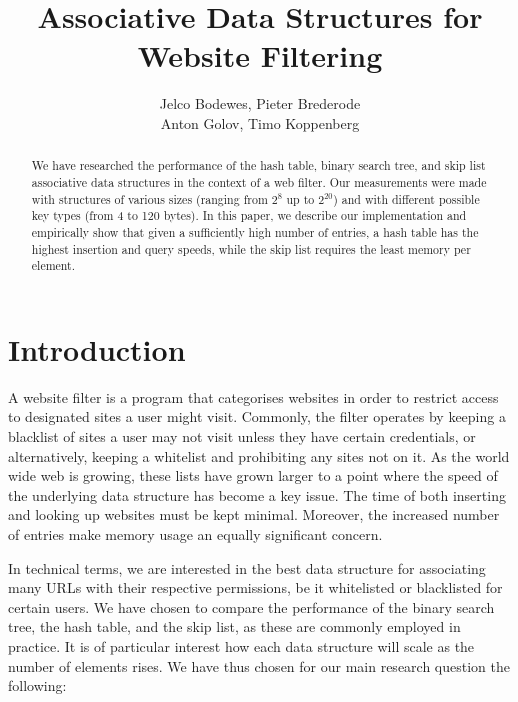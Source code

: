\documentclass[12pt,a4paper]{article}
\title{Associative Data Structures for Website Filtering}
\author{Jelco Bodewes, Pieter Brederode \\ Anton Golov, Timo Koppenberg }
\begin{document}
    \maketitle

    \begin{abstract}
        We have researched the performance of the hash table, binary search tree, and skip list
        associative data structures in the context of a web filter.  Our measurements were made with
        structures of various sizes (ranging from $2^8$ up to $2^{20}$) and with different possible
        key types (from 4 to 120 bytes).  In this paper, we describe our implementation and
        empirically show that given a sufficiently high number of entries, a hash table has the
        highest insertion and query speeds, while the skip list requires the least memory per
        element.
    \end{abstract}


    \section{Introduction}
    A website filter is a program that categorises websites in order to restrict access to
    designated sites a user might visit. Commonly, the filter operates by keeping a blacklist of
    sites a user may not visit unless they have certain credentials, or alternatively, keeping a
    whitelist and prohibiting any sites not on it.  As the world wide web is growing, these lists
    have grown larger to a point where the speed of the underlying data structure has become a key
    issue.  The time of both inserting and looking up websites must be kept minimal. Moreover, the
    increased number of entries make memory usage an equally significant concern.

    In technical terms, we are interested in the best data structure for associating many URLs with
    their respective permissions, be it whitelisted or blacklisted for certain users.  We have
    chosen to compare the performance of the binary search tree, the hash table, and the skip list, as
    these are commonly employed in practice.  It is of particular interest how each data structure
    will scale as the number of elements rises.  We have thus chosen for our main research question
    the following:
\end{document}
